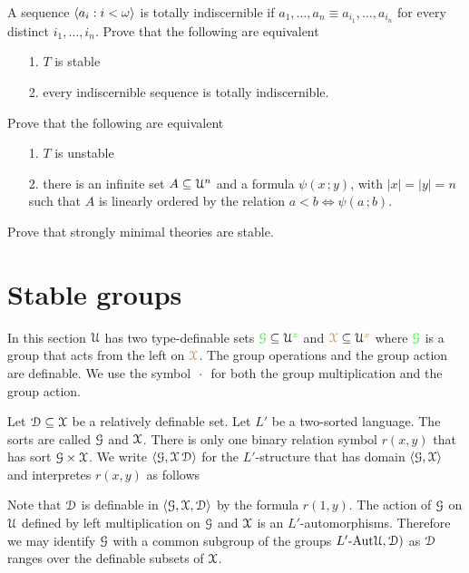 \begin{exercise} 
  A sequence $\langle a_i:i<\omega\rangle$ is totally indiscernible if $a_1,\dots,a_n\equiv a_{i_1},\dots,a_{i_n}$ for every distinct $i_1,\dots,i_n$.
  Prove that the following are equivalent
  \begin{itemize}
  \item[1.] $T$ is stable
  \item[2.] every indiscernible sequence is totally indiscernible.
  \end{itemize}
\end{exercise}

\begin{exercise}\label{ex_stable_orderproperty}
Prove that the following are equivalent
\begin{itemize}
\item[1.] $T$ is unstable
\item[2.] there is an infinite set $A\subseteq\EuScript U^n$ and a formula  $\psi(x\,;y)$, with $|x|=|y|=n$ such that $A$ is linearly ordered by the relation $a<b\iff\psi(a\,;b)$.
\end{itemize}
\end{exercise}

\begin{exercise}
Prove that strongly minimal theories are stable.
\end{exercise}

\section{Stable groups}

In this section $\EuScript U$ has two type-definable sets ${\color{green}\EuScript G}\subseteq\EuScript U^{\color{green} z}$ and ${\color{brown}\EuScript X}\subseteq\EuScript U^{\color{brown} x}$ where ${\color{green}\EuScript G}$ is a group that acts from the left on ${\color{brown}\EuScript X}$.
The group operations and the group action are definable.
We use the symbol $\,\cdot\,$ for both the group multiplication and the group action.

Let $\EuScript D\subseteq\EuScript X$ be a relatively definable set.
Let $L'$ be a two-sorted language.
The sorts are called $\EuScript G$ and $\EuScript X$.
There is only one binary relation symbol $r(x,y)$ that has sort $\EuScript G\times\EuScript X$.
We write $\langle\EuScript G, \EuScript X\, \EuScript D\rangle$ for the $L'$-structure that has domain $\langle\EuScript G, \EuScript X\rangle$ and interpretes $r(x,y)$ as follows 


Note that $\EuScript D$ is definable in $\langle\EuScript G,\EuScript X, \EuScript D\rangle$ by the formula $r(1,y)$.
The action of $\EuScript G$ on $\EuScript U$ defined by left multiplication on $\EuScript G$ and $\EuScript X$ is an $L'$-automorphisms.
Therefore we may identify $\EuScript G$ with a common subgroup of the groups $L'\mbox{-Aut}\EuScript U,{\EuScript D})$ as $\EuScript D$ ranges over the definable subsets of $\EuScript X$.

